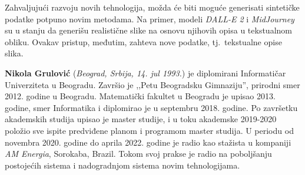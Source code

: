 \documentclass[12pt,oneside]{memoir}
\begin{document}
Zahvaljujući razvoju novih tehnologija, možda će biti moguće generisati sintetičke podatke potpuno novim metodama. Na primer, modeli \textit{DALL-E 2} \cite{reddy2021dall} i \textit{MidJourney} \cite{midjourney2022} su u stanju da generišu realistične slike na osnovu njihovih opisa u tekstualnom obliku. Ovakav pristup, međutim, zahteva nove podatke, tj.~tekstualne opise slika.


\literatura


\backmatter


\begin{biografija}
  \textbf{Nikola Grulović} (\emph{Beograd, Srbija,
    14. jul 1993.}) je diplomirani Informatičar Univerziteta u Beogradu. Završio je ,,Petu Beogradsku Gimnaziju'', prirodni smer 2012. godine u Beogradu. Matematički fakultet u Beogradu je upisao 2013. godine, smer Informatika i diplomirao je u septembru 2018. godine. Po završetku akademskih studija upisao je master studije, i u toku akademske 2019-2020 položio sve ispite predviđene planom i programom master studija. U periodu od novembra 2020. godine do aprila 2022. godine je radio kao stažista u kompaniji \textit{AM Energia}, Sorokaba, Brazil. Tokom svoj prakse je radio na poboljšanju postojećih sistema i nadogradnjom sistema novim tehnologijama.
\end{biografija}
\end{document}
